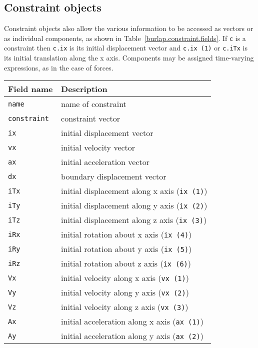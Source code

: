 \subsection{Constraint objects}

Constraint objects also allow the various information to be accessed
as vectors or as individual components, as shown in
Table~\ref{burlap.constraint.fields}.  If {\tt c} is a constraint then
{\tt c.ix} is its initial displacement vector and {\tt c.ix (1)} or
{\tt c.iTx} is its initial translation along the x axis.  Components
may be assigned time-varying expressions, as in the case of forces.

{\scriptsize
\begin{table}[htbp]
\begin{center}
\begin{tabular}{l|l}
Field name	& Description						\\
\hline
\tt name	& name of constraint					\\
\tt constraint	& constraint vector					\\
\tt ix		& initial displacement vector				\\
\tt vx		& initial velocity vector				\\
\tt ax		& initial acceleration vector				\\
\tt dx		& boundary displacement vector				\\
\tt iTx		& initial displacement along x axis ({\tt ix (1)})	\\
\tt iTy		& initial displacement along y axis ({\tt ix (2)})	\\
\tt iTz		& initial displacement along z axis ({\tt ix (3)})	\\
\tt iRx		& initial rotation about x axis ({\tt ix (4)})		\\
\tt iRy		& initial rotation about y axis ({\tt ix (5)})		\\
\tt iRz		& initial rotation about z axis ({\tt ix (6)})		\\
\tt Vx		& initial velocity along x axis ({\tt vx (1)})		\\
\tt Vy		& initial velocity along y axis ({\tt vx (2)})		\\
\tt Vz		& initial velocity along z axis ({\tt vx (3)})		\\
\tt Ax		& initial acceleration along x axis ({\tt ax (1)})	\\
\tt Ay		& initial acceleration along y axis ({\tt ax (2)})	\\

\end{tabular}
\end{center}
\end{table}}
